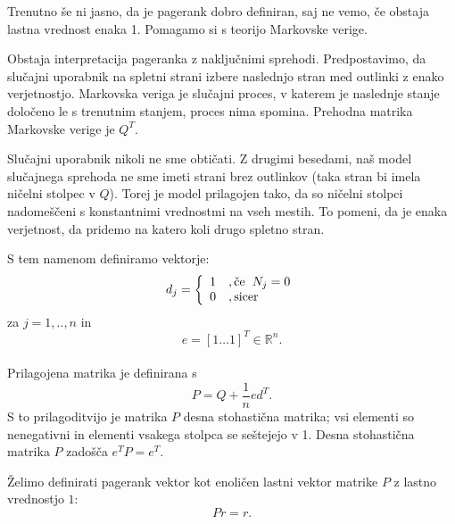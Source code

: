 \documentclass[12pt,a4paper]{amsart}
\begin{document}
Trenutno še ni jasno, da je pagerank dobro definiran, saj ne vemo, če obstaja lastna vrednost enaka 1. Pomagamo si s teorijo Markovske verige.

Obstaja interpretacija pageranka z naključnimi sprehodi. Predpostavimo, da slučajni uporabnik na spletni strani izbere naslednjo stran  med outlinki z enako verjetnostjo. Markovska veriga je slučajni proces, v katerem je naslednje stanje določeno le s trenutnim stanjem, proces nima spomina. Prehodna matrika Markovske verige je $Q^T$.

Slučajni uporabnik nikoli ne sme obtičati. Z drugimi besedami, naš model slučajnega sprehoda ne sme imeti strani brez outlinkov (taka stran bi imela ničelni stolpec v $Q$). Torej je model prilagojen tako, da so ničelni stolpci nadomeščeni s konstantnimi vrednostmi na vseh mestih. To pomeni, da je enaka verjetnost, da pridemo na katero koli drugo spletno stran. 

S tem namenom definiramo vektorje: \\
\[
d_j = 
\left \{
	\begin{array}{ll}
		1  &, \mbox{če}\hspace{2mm} N_j = 0 \\
		0 &, \mbox{sicer} 
	\end{array}
\right. \]
za $j = 1, .., n$ in \\
$$e = [1 … 1] ^T \in \mathbb{R}^n.$$ \\
Prilagojena matrika je definirana s \\
$$ P = Q + \frac{1}{n}ed^T.$$ 
S to prilagoditvijo je matrika $P$ desna stohastična matrika; vsi elementi so nenegativni in elementi vsakega stolpca se seštejejo v 1.
Desna stohastična matrika $P$ zadošča $e^TP = e^T.$ 

Želimo definirati pagerank vektor kot enoličen lastni vektor matrike $P$ z lastno vrednostjo $1$:
$$Pr=r.$$ 
\end{document}
